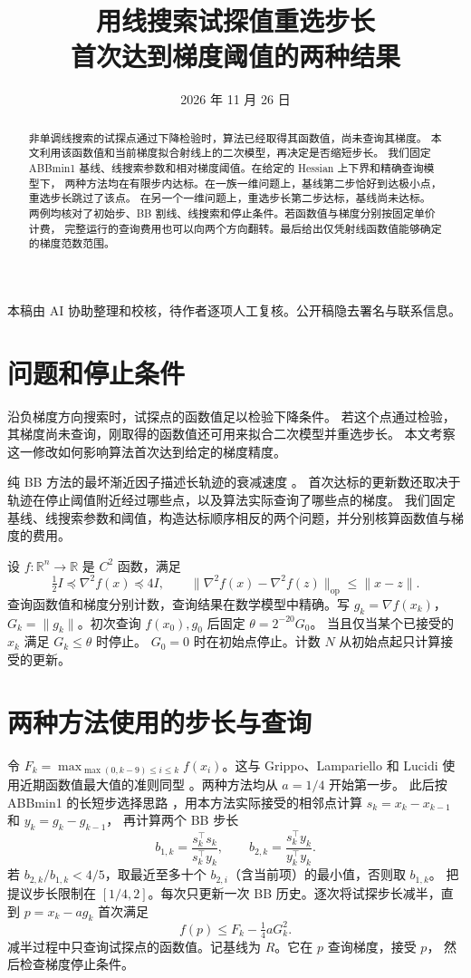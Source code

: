 \documentclass[UTF8,11pt]{ctexart}
\title{用线搜索试探值重选步长\\[3pt]\large 首次达到梯度阈值的两种结果}
\author{}
\date{2026 年 11 月 26 日}
\newcommand{\R}{\mathbb{R}}
\newcommand{\norm}[1]{\lVert #1\rVert}
\begin{document}
\maketitle
\begin{abstract}
非单调线搜索的试探点通过下降检验时，算法已经取得其函数值，尚未查询其梯度。
本文利用该函数值和当前梯度拟合射线上的二次模型，再决定是否缩短步长。
我们固定 ABBmin1 基线、线搜索参数和相对梯度阈值。在给定的 Hessian 上下界和精确查询模型下，
两种方法均在有限步内达标。在一族一维问题上，基线第二步恰好到达极小点，重选步长跳过了该点。
在另一个一维问题上，重选步长第二步达标，基线尚未达标。
两例均核对了初始步、BB 割线、线搜索和停止条件。若函数值与梯度分别按固定单价计费，
完整运行的查询费用也可以向两个方向翻转。最后给出仅凭射线函数值能够确定的梯度范数范围。
\end{abstract}
{\small 本稿由 AI 协助整理和校核，待作者逐项人工复核。公开稿隐去署名与联系信息。}
\section{问题和停止条件}
沿负梯度方向搜索时，试探点的函数值足以检验下降条件。
若这个点通过检验，其梯度尚未查询，刚取得的函数值还可用来拟合二次模型并重选步长。
本文考察这一修改如何影响算法首次达到给定的梯度精度。

纯 BB 方法的最坏渐近因子描述长轨迹的衰减速度 \cite{yysharp}。
首次达标的更新数还取决于轨迹在停止阈值附近经过哪些点，以及算法实际查询了哪些点的梯度。
我们固定基线、线搜索参数和阈值，构造达标顺序相反的两个问题，并分别核算函数值与梯度的费用。

设 $f\colon\R^n\to\R$ 是 $C^2$ 函数，满足
\[
  \tfrac12 I\preceq \nabla^2 f(x)\preceq4I,\qquad
  \norm{\nabla^2 f(x)-\nabla^2 f(z)}_{\mathrm{op}}\le\norm{x-z}.
\]
查询函数值和梯度分别计数，查询结果在数学模型中精确。写 $g_k=\nabla f(x_k)$，
$G_k=\norm{g_k}$。初次查询 $f(x_0),g_0$ 后固定 $\theta=2^{-20}G_0$。
当且仅当某个已接受的 $x_k$ 满足 $G_k\le\theta$ 时停止。
$G_0=0$ 时在初始点停止。计数 $N$ 从初始点起只计算接受的更新。

\section{两种方法使用的步长与查询}
令 $F_k=\max_{\max(0,k-9)\le i\le k}f(x_i)$。这与 Grippo、Lampariello 和 Lucidi
使用近期函数值最大值的准则同型 \cite{gll}。两种方法均从 $a=1/4$ 开始第一步。
此后按 ABBmin1 的长短步选择思路 \cite{abbmin}，用本方法实际接受的相邻点计算 $s_k=x_k-x_{k-1}$ 和 $y_k=g_k-g_{k-1}$，
再计算两个 BB 步长 \cite{bb}
\[
  b_{1,k}=\frac{s_k^\top s_k}{s_k^\top y_k},\qquad
  b_{2,k}=\frac{s_k^\top y_k}{y_k^\top y_k}.
\]
若 $b_{2,k}/b_{1,k}<4/5$，取最近至多十个 $b_{2,i}$（含当前项）的最小值，否则取 $b_{1,k}$。
把提议步长限制在 $[1/4,2]$。每次只更新一次 BB 历史。逐次将试探步长减半，直到 $p=x_k-ag_k$ 首次满足
\begin{equation}\label{eq:gll}
     f(p)\le F_k-\tfrac14 aG_k^2.
\end{equation}
减半过程中只查询试探点的函数值。记基线为 $R$。它在 $p$ 查询梯度，接受 $p$，
然后检查梯度停止条件。
\end{document}
